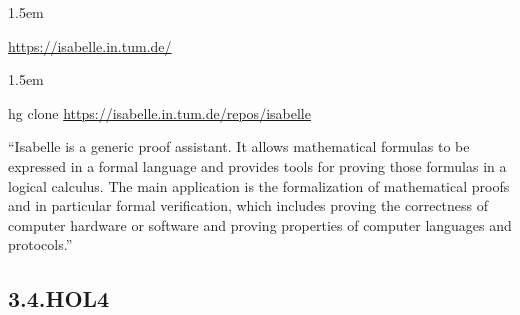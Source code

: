 \documentclass[12pt,twoside]{article}
\begin{document}
\begin{mddefinitions}%


\begin{mdbmarginx}{}{}{}{1.5em}%
\begin{mddefdata}%
\href{https://isabelle.in.tum.de/}{{\ttfamily https://\hspace{0pt}isabelle.\hspace{0pt}in.\hspace{0pt}tum.\hspace{0pt}de/\hspace{0pt}}}
\end{mddefdata}%
\end{mdbmarginx}%


\begin{mdbmarginx}{}{}{}{1.5em}%
\begin{mddefdata}%
hg clone \href{https://isabelle.in.tum.de/repos/isabelle}{{\ttfamily https://\hspace{0pt}isabelle.\hspace{0pt}in.\hspace{0pt}tum.\hspace{0pt}de/\hspace{0pt}repos/\hspace{0pt}isabelle}}%
\end{mddefdata}%
\end{mdbmarginx}%
\end{mddefinitions}%

\noindent{}\textquotedblleft{}Isabelle is a generic proof assistant. It allows mathematical
formulas to be expressed in a formal language and provides tools for
proving those formulas in a logical calculus. The main application is
the formalization of mathematical proofs and in particular formal
verification, which includes proving the correctness of computer
hardware or software and proving properties of computer languages and
protocols.\textquotedblright{}%

\subsection{3.4.\hspace*{0.5em}HOL4}%
\end{document}
